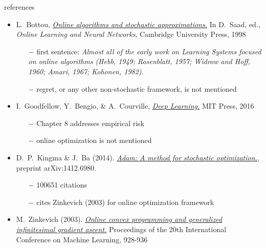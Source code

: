 \documentclass[xcolor={svgnames},
               hyperref={colorlinks,citecolor=DeepPink4,linkcolor=FireBrick,urlcolor=Maroon}]
               {beamer}
\begin{document}
\begin{frame}{references}

\begin{itemize}
\footnotesize
\item L.~Bottou, \href{http://leon.bottou.org/papers/bottou-98x}{\emph{Online algorithms and stochastic approximations.}}  In D.~Saad, ed., \emph{Online Learning and Neural Networks}, Cambridge University Press, 1998
    \begin{itemize}
    \scriptsize
    \item[$-$] first sentence: \emph{Almost all of the early work on Learning Systems focused on online algorithms (Hebb, 1949; Rosenblatt, 1957; Widrow and Hoff, 1960; Amari, 1967; Kohonen, 1982).}
    \item[$-$] regret, or any other non-stochastic framework, is not mentioned
    \end{itemize}
\item I.~Goodfellow, Y.~Bengio, \& A.~Courville, \href{https://www.deeplearningbook.org/}{\emph{Deep Learning.}} MIT Press, 2016
    \begin{itemize}
    \scriptsize
    \item[$-$] Chapter 8 addresses empirical risk
    \item[$-$] online optimization is not mentioned
    \end{itemize}
\item D.~P.~Kingma \& J.~Ba (2014). \href{https://arxiv.org/abs/1412.6980}{\emph{Adam: A method for stochastic optimization.}}, preprint arXiv:1412.6980.
    \begin{itemize}
    \scriptsize
    \item[$-$] 100651 citations
    \item[$-$] cites Zinkevich (2003) for online optimization framework
    \end{itemize}
\item M.~Zinkevich (2003). \href{https://www.aaai.org/Papers/ICML/2003/ICML03-120.pdf}{\emph{Online convex programming and generalized infinitesimal gradient ascent.}} Proceedings of the 20th International Conference on Machine Learning, 928-936
\end{itemize}
\end{frame}
\end{document}
